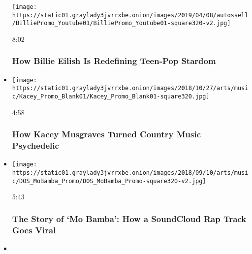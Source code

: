 \begin{itemize}
  \texttt{[image: https://static01.graylady3jvrrxbe.onion/images/2019/04/08/autossell/BilliePromo\_Youtube01/BilliePromo\_Youtube01-square320-v2.jpg]}

  8:02

  \hypertarget{how-billie-eilish-is-redefining-teen-pop-stardom}{%
  \subsubsection{How Billie Eilish Is Redefining Teen-Pop
  Stardom}\label{how-billie-eilish-is-redefining-teen-pop-stardom}}
\item
  \href{https://www.nytimes3xbfgragh.onion/video/arts/music/100000006000270/kacey-musgraves-slow-burn-country-music.html?action=click\&module=video-series-bar\&region=header\&pgtype=Article\&playlistId=video/diaryofasong}{}

  \texttt{[image: https://static01.graylady3jvrrxbe.onion/images/2018/10/27/arts/music/Kacey\_Promo\_Blank01/Kacey\_Promo\_Blank01-square320.jpg]}

  4:58

  \hypertarget{how-kacey-musgraves-turned-country-music-psychedelic}{%
  \subsubsection{How Kacey Musgraves Turned Country Music
  Psychedelic}\label{how-kacey-musgraves-turned-country-music-psychedelic}}
\item
  \href{https://www.nytimes3xbfgragh.onion/video/arts/music/100000006000184/mo-bamba-sheck-wes-rap.html?action=click\&module=video-series-bar\&region=header\&pgtype=Article\&playlistId=video/diaryofasong}{}

  \texttt{[image: https://static01.graylady3jvrrxbe.onion/images/2018/09/10/arts/music/DOS\_MoBamba\_Promo/DOS\_MoBamba\_Promo-square320-v2.jpg]}

  5:43

  \hypertarget{the-story-of-mo-bamba-how-a-soundcloud-rap-track-goes-viral}{%
  \subsubsection{The Story of `Mo Bamba': How a SoundCloud Rap Track
  Goes
  Viral}\label{the-story-of-mo-bamba-how-a-soundcloud-rap-track-goes-viral}}
\item
  \href{https://www.nytimes3xbfgragh.onion/video/arts/music/100000005858557/watch-how-a-pop-hit-is-made.html?action=click\&module=video-series-bar\&region=header\&pgtype=Article\&playlistId=video/diaryofasong}{}


\end{itemize}
